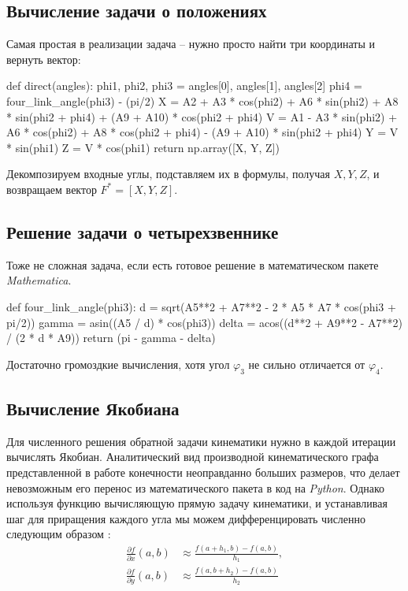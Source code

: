 \subsection{Вычисление задачи о положениях}

Самая простая в реализации задача -- нужно просто найти три координаты и вернуть вектор:
\begin{python}
def direct(angles):
    phi1, phi2, phi3 = angles[0], angles[1], angles[2]
    phi4 = four_link_angle(phi3) - (pi/2)
    X = A2 + A3 * cos(phi2) + A6 * sin(phi2) + A8 * sin(phi2 + phi4) + (A9 + A10) * cos(phi2 + phi4)
    V = A1 - A3 * sin(phi2) + A6 * cos(phi2) + A8 * cos(phi2 + phi4) - (A9 + A10) * sin(phi2 + phi4)
    Y = V * sin(phi1)
    Z = V * cos(phi1)
    return np.array([X, Y, Z])
\end{python}

\noindent Декомпозируем входные углы, подставляем их в формулы, получая $ X, Y, Z $, и возвращаем вектор $ F^* =[ X, Y, Z ] $.

\subsection{Решение задачи о четырехзвеннике}
Тоже не сложная задача, если есть готовое решение в математическом пакете \textit{Mathematica}.
\begin{python}
def four_link_angle(phi3):
    d = sqrt(A5**2 + A7**2 - 2 * A5 * A7 * cos(phi3 + pi/2))
    gamma = asin((A5 / d) * cos(phi3))
    delta = acos((d**2 + A9**2 - A7**2) / (2 * d * A9))
    return (pi - gamma - delta)
\end{python}

\noindent Достаточно громоздкие вычисления, хотя угол $ \varphi_3 $ не сильно отличается от $ \varphi_4 $.

\subsection{Вычисление Якобиана}
Для численного решения обратной задачи кинематики нужно в каждой итерации вычислять Якобиан. Аналитический вид производной кинематического графа представленной в работе конечности неоправданно больших размеров, что делает невозможным его перенос из математического пакета в код на \textit{Python}. Однако используя функцию вычисляющую прямую задачу кинематики, и устанавливая шаг для приращения каждого угла мы можем дифференцировать численно следующим образом \cite{Morken2010}:
\begin{align*}
    \frac{\partial f}{\partial x}(a, b) &\approx \frac{f(a+h_1, b) - f(a, b)}{h_1}, \\ 
    \frac{\partial f}{\partial y}(a, b) &\approx \frac{f(a, b+h_2) - f(a, b)}{h_2}
\end{align*}

